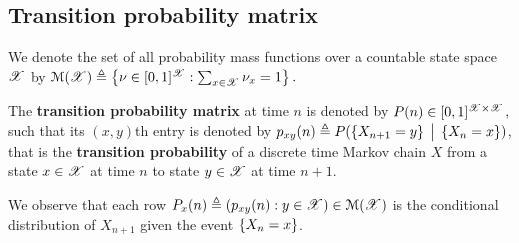 \documentclass[letterpaper,10pt,english]{article}
\begin{document}
\subsection{Transition probability matrix}
\begin{defn}
We denote the set of all probability mass functions over a countable state space $\mathscr{X}$ by 
$
\mathcal{M}(\mathscr{X})\triangleq \left\{\nu \in [0,1]^{\mathscr{X}}: \sum_{x\in \mathscr{X}}\nu_x = 1\right\}. 
$
\end{defn}
\begin{defn} 
The \textbf{transition probability matrix} at time $n$ is denoted by $P(n) \in [0,1]^{\mathscr{X} \times \mathscr{X}}$, 
such that its $(x,y)$th entry is denoted by $p_{xy}(n) \triangleq P(\left\{X_{n+1} = y\right\}\; \big\vert \;\left\{X_n = x\right\})$, that is the \textbf{transition probability} of a discrete time Markov chain $X$ from a state $x \in \mathscr{X}$ at time $n$ to state $y \in \mathscr{X}$ at time $n+1$. 
\end{defn}
\begin{rem}
We observe that each row $P_{x}(n) \triangleq (p_{xy}(n): y \in \mathscr{X}) \in\mathcal{M}(\mathscr{X})$ is the conditional distribution of $X_{n+1}$ given the event $\left\{X_n = x\right\}$. 
\end{rem}
\end{document}
